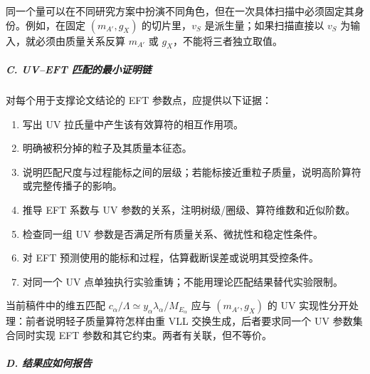 \documentclass[
  chinese,
  UTF8]{ctexart}
\providecommand{\tightlist}{%
  \setlength{\itemsep}{0pt}\setlength{\parskip}{0pt}}
\begin{document}
同一个量可以在不同研究方案中扮演不同角色，但在一次具体扫描中必须固定其身份。例如，在固定
\((m_{A'},g_X)\) 的切片里，\(v_S\) 是派生量；如果扫描直接以 \(v_S\)
为输入，就必须由质量关系反算 \(m_{A'}\) 或 \(g_X\)，不能将三者独立取值。

\subparagraph{C. UV--EFT
匹配的最小证明链}\label{c.-uveft-ux5339ux914dux7684ux6700ux5c0fux8bc1ux660eux94fe}

对每个用于支撑论文结论的 EFT 参数点，应提供以下证据：

\begin{enumerate}
\def\labelenumi{\arabic{enumi}.}
\tightlist
\item
  写出 UV 拉氏量中产生该有效算符的相互作用项。
\item
  明确被积分掉的粒子及其质量本征态。
\item
  说明匹配尺度与过程能标之间的层级；若能标接近重粒子质量，说明高阶算符或完整传播子的影响。
\item
  推导 EFT 系数与 UV 参数的关系，注明树级/圈级、算符维数和近似阶数。
\item
  检查同一组 UV 参数是否满足所有质量关系、微扰性和稳定性条件。
\item
  对 EFT 预测使用的能标和过程，估算截断误差或说明其受控条件。
\item
  对同一个 UV 点单独执行实验重铸；不能用理论匹配结果替代实验限制。
\end{enumerate}

当前稿件中的维五匹配
\(c_\alpha/\Lambda\simeq y_\alpha\lambda_\alpha/M_{E_\alpha}\) 应与
\((m_{A'},g_X)\) 的 UV 实现性分开处理：前者说明轻子质量算符怎样由重 VLL
交换生成，后者要求同一个 UV 参数集合同时实现 EFT
参数和其它约束。两者有关联，但不等价。

\subparagraph{D.
结果应如何报告}\label{d.-ux7ed3ux679cux5e94ux5982ux4f55ux62a5ux544a}
\end{document}
